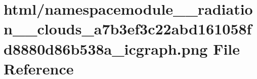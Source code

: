 \hypertarget{namespacemodule____radiation____clouds__a7b3ef3c22abd161058fd8880d86b538a__icgraph_8png}{}\section{html/namespacemodule\+\_\+\+\_\+radiation\+\_\+\+\_\+clouds\+\_\+a7b3ef3c22abd161058fd8880d86b538a\+\_\+icgraph.png File Reference}
\label{namespacemodule____radiation____clouds__a7b3ef3c22abd161058fd8880d86b538a__icgraph_8png}
